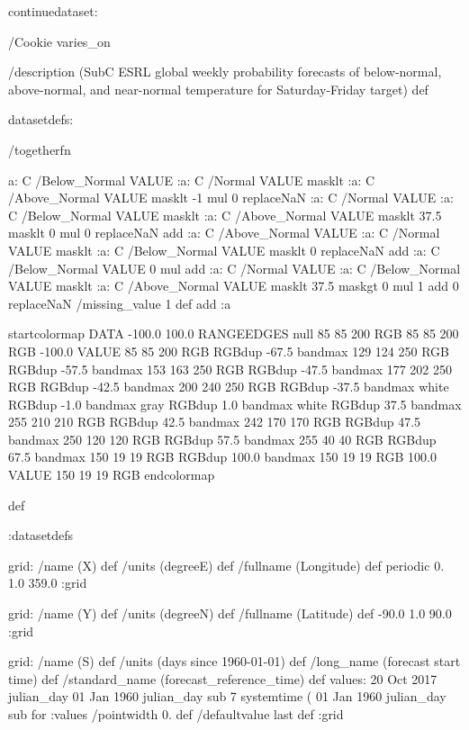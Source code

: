 \begin{ingrid}

continuedataset:



/Cookie varies_on

/description (SubC ESRL global weekly probability forecasts of below-normal, above-normal, and near-normal temperature for Saturday-Friday target) def

datasetdefs:

/togetherfn {
 a:
    C /Below_Normal VALUE
    :a:
     C /Normal VALUE
     masklt
    :a:
     C /Above_Normal VALUE
     masklt
    -1 mul
    0 replaceNaN
    :a:
     C /Normal VALUE
     :a:
      C /Below_Normal VALUE
      masklt
     :a:
      C /Above_Normal VALUE
      masklt
     37.5 masklt
     0 mul
     0 replaceNaN           
     add
    :a:
     C /Above_Normal VALUE
     :a:
      C /Normal VALUE
      masklt
     :a:
      C /Below_Normal VALUE
      masklt
     0 replaceNaN
     add
 :a:
     C /Below_Normal VALUE
     0 mul
     add
    :a:
     C /Normal VALUE
     :a:
      C /Below_Normal VALUE
      masklt
     :a:
      C /Above_Normal VALUE        
      masklt
     37.5 maskgt
     0 mul
     1 add
     0 replaceNaN
     /missing_value 1 def
     add
    :a

startcolormap
DATA -100.0 100.0 RANGEEDGES
null 85 85 200 RGB
85 85 200 RGB -100.0 VALUE
85 85 200 RGB RGBdup -67.5 bandmax
129 124 250 RGB RGBdup -57.5 bandmax
153 163 250 RGB RGBdup -47.5 bandmax
177 202 250 RGB RGBdup -42.5 bandmax
200 240 250 RGB RGBdup -37.5 bandmax
white RGBdup -1.0 bandmax
gray RGBdup 1.0 bandmax
white RGBdup 37.5 bandmax
255 210 210 RGB RGBdup 42.5 bandmax
242 170 170 RGB RGBdup 47.5 bandmax
250 120 120 RGB RGBdup 57.5 bandmax
255 40 40 RGB RGBdup 67.5 bandmax
150 19 19 RGB RGBdup 100.0 bandmax
150 19 19 RGB 100.0 VALUE
150 19 19 RGB
endcolormap
} def 

:datasetdefs


grid:
/name (X) def
/units (degreeE) def
/fullname (Longitude) def
periodic
0. 1.0 359.0
:grid

grid:
/name (Y) def
/units (degreeN) def
/fullname (Latitude) def
-90.0 1.0 90.0
:grid


grid:
/name (S) def
/units (days since 1960-01-01) def
/long_name (forecast start time) def
/standard_name (forecast_reference_time) def
values:
20 Oct 2017 julian_day 01 Jan 1960 julian_day sub
7
systemtime
(%
01 Jan 1960 julian_day sub
{} for
:values
/pointwidth 0. def
/defaultvalue { last } def
:grid


\end{ingrid}
